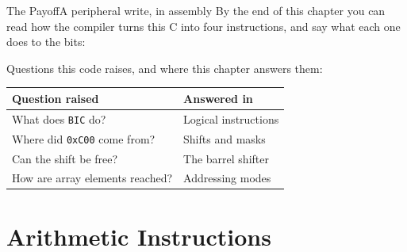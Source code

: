\documentclass[9pt,aspectratio=169,xcolor=table]{beamer}
\begin{document}
{\beamerextras
\begin{frame}[fragile]{The Payoff}{A peripheral write, in assembly}
    \leavevmode
    By the end of this chapter you can read how the compiler turns this C into four instructions, and say what each one does to the bits:

    \vspace{2mm}
    \begin{center}
    \begin{minipage}{.9\textwidth}
    \end{minipage}
    \end{center}

    \vspace{2mm}
    {\small Questions this code raises, and where this chapter answers them:}

    \vspace{1mm}
    \begin{center}
    {\small
    \striped
    \begin{tabular}{@{}l R{.52\textwidth}@{}}
        \toprule
        \textbf{Question raised} & \textbf{Answered in} \\
        \midrule
        What does \texttt{BIC} do? & Logical instructions \\
        Where did \texttt{0xC00} come from? & Shifts and masks \\
        Can the shift be free? & The barrel shifter \\
        How are array elements reached? & Addressing modes \\
        \bottomrule
    \end{tabular}}
    \end{center}
\end{frame}
}


\section{Arithmetic Instructions}
\end{document}
